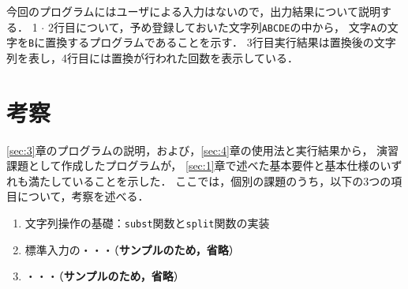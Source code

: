 



今回のプログラムにはユーザによる入力はないので，出力結果について説明する．
1 $\cdot$ 2行目について，予め登録しておいた文字列\verb|ABCDE|の中から，
文字\verb|A|の文字を\verb|B|に置換するプログラムであることを示す．
3行目実行結果は置換後の文字列を表し，4行目には置換が行われた回数を表示している．




\section{考察} \label{sec:5}

\ref{sec:3}章のプログラムの説明，および，\ref{sec:4}章の使用法と実行結果から，
演習課題として作成したプログラムが，
\ref{sec:1}章で述べた基本要件と基本仕様のいずれも満たしていることを示した．
ここでは，個別の課題のうち，以下の3つの項目について，考察を述べる．

\begin{enumerate}
\setlength{\parskip}{2pt} \setlength{\itemsep}{2pt}
    \item 文字列操作の基礎：\texttt{subst}関数と\texttt{split}関数の実装
    \item 標準入力の・・・（\textbf{サンプルのため，省略}）
    \item ・・・（\textbf{サンプルのため，省略}）
\end{enumerate}

